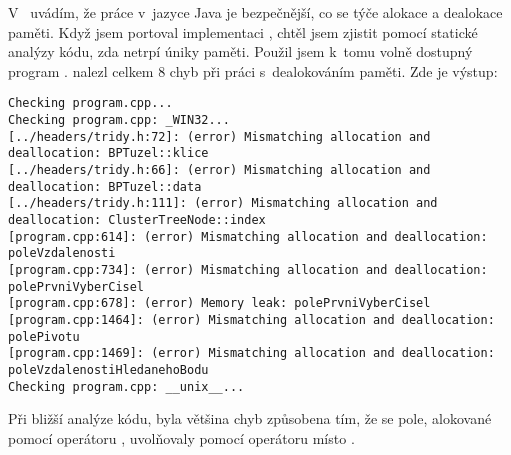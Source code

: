 V~ uvádím, že práce v~jazyce Java je bezpečnější, co se týče alokace a dealokace paměti.
Když jsem portoval implementaci \CC{}, chtěl jsem zjistit pomocí statické analýzy kódu, zda netrpí úniky paměti.
Použil jsem k~tomu volně dostupný program \cite{cppcheck}.
 nalezl celkem 8 chyb při práci s~dealokováním paměti. Zde je výstup:
{\tiny
\begin{verbatim}
Checking program.cpp...
Checking program.cpp: _WIN32...
[../headers/tridy.h:72]: (error) Mismatching allocation and deallocation: BPTuzel::klice
[../headers/tridy.h:66]: (error) Mismatching allocation and deallocation: BPTuzel::data
[../headers/tridy.h:111]: (error) Mismatching allocation and deallocation: ClusterTreeNode::index
[program.cpp:614]: (error) Mismatching allocation and deallocation: poleVzdalenosti
[program.cpp:734]: (error) Mismatching allocation and deallocation: polePrvniVyberCisel
[program.cpp:678]: (error) Memory leak: polePrvniVyberCisel
[program.cpp:1464]: (error) Mismatching allocation and deallocation: polePivotu
[program.cpp:1469]: (error) Mismatching allocation and deallocation: poleVzdalenostiHledanehoBodu
Checking program.cpp: __unix__...
\end{verbatim}
}

Při bližší analýze kódu, byla většina chyb způsobena tím, že se pole, alokované pomocí operátoru , uvolňovaly pomocí operátoru  místo \cite{Stroustrup:1997:CPL:523265}.
